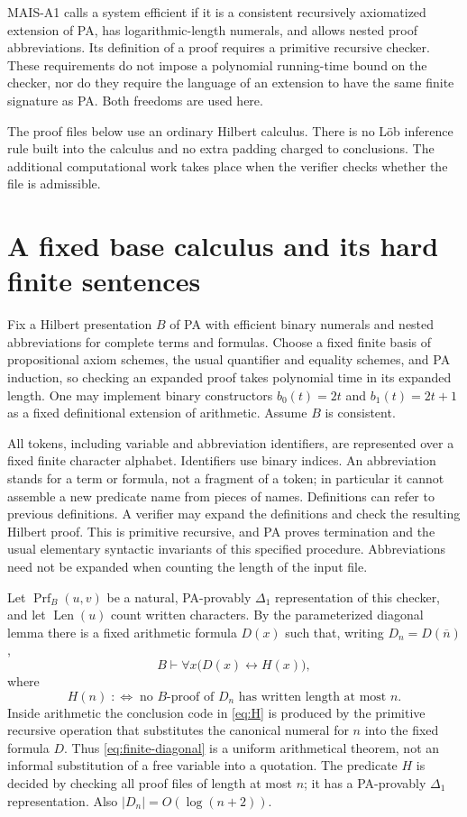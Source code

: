 \documentclass[11pt]{article}
\theoremstyle{remark}
\newcommand{\Prf}{\operatorname{Prf}}
\newcommand{\Len}{\operatorname{Len}}
\newcommand{\num}[1]{\overline{#1}}
\begin{document}
MAIS-A1 calls a system efficient if it is a consistent recursively
axiomatized extension of PA, has logarithmic-length numerals, and allows
nested proof abbreviations. Its definition of a proof requires a primitive
recursive checker. These requirements do not impose a polynomial running-time
bound on the checker, nor do they require the language of an extension to
have the same finite signature as PA. Both freedoms are used here.

The proof files below use an ordinary Hilbert calculus. There is no L\"ob
inference rule built into the calculus and no extra padding charged to
conclusions. The additional computational work takes place when the verifier
checks whether the file is admissible.

\section{A fixed base calculus and its hard finite sentences}

Fix a Hilbert presentation $B$ of PA with efficient binary numerals and
nested abbreviations for complete terms and formulas. Choose a fixed finite
basis of propositional axiom schemes, the usual quantifier and equality
schemes, and PA induction, so checking an expanded proof takes polynomial
time in its expanded length. One may implement
binary constructors $b_0(t)=2t$ and $b_1(t)=2t+1$ as a fixed definitional
extension of arithmetic. Assume $B$ is consistent.

All tokens, including variable and abbreviation identifiers, are represented
over a fixed finite character alphabet. Identifiers use binary indices.
An abbreviation stands for a term or formula, not a fragment of a token;
in particular it cannot assemble a new predicate name from pieces of names.
Definitions can refer to previous definitions. A verifier may expand the
definitions and check the resulting Hilbert proof. This is primitive recursive,
and PA proves termination and the usual elementary syntactic invariants of
this specified procedure. Abbreviations need not be expanded when counting
the length of the input file.

Let $\Prf_B(u,v)$ be a natural, PA-provably $\Delta_1$ representation of this
checker, and let $\Len(u)$ count written characters. By the parameterized
diagonal lemma there is a fixed arithmetic formula $D(x)$ such that, writing
$D_n=D(\num n)$,
\begin{equation}\label{eq:finite-diagonal}
 B\vdash\forall x\bigl(D(x)\leftrightarrow H(x)\bigr),
\end{equation}
where
\begin{equation}\label{eq:H}
 H(n)\;:\Longleftrightarrow\;
 \text{no $B$-proof of $D_n$ has written length at most $n$}.
\end{equation}
Inside arithmetic the conclusion code in \eqref{eq:H} is produced by the
primitive recursive operation that substitutes the canonical numeral for $n$
into the fixed formula $D$. Thus \eqref{eq:finite-diagonal} is a uniform
arithmetical theorem, not an informal substitution of a free variable into a
quotation. The predicate $H$ is decided by checking all proof files of length
at most $n$; it has a PA-provably $\Delta_1$ representation. Also
$|D_n|=O(\log(n+2))$.
\end{document}
